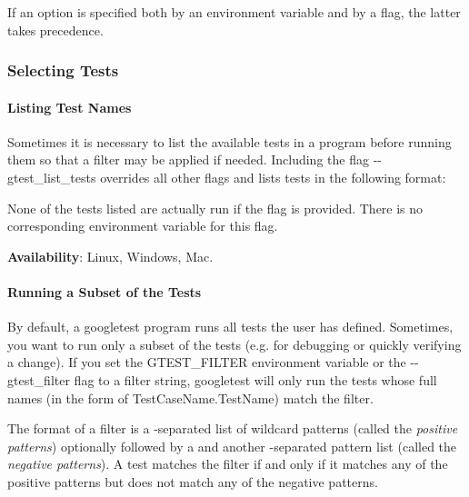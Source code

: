 If an option is specified both by an environment variable and by a flag, the latter takes precedence.

\subsubsection*{Selecting Tests}

\paragraph*{Listing Test Names}

Sometimes it is necessary to list the available tests in a program before running them so that a filter may be applied if needed. Including the flag {\ttfamily -\/-\/gtest\+\_\+list\+\_\+tests} overrides all other flags and lists tests in the following format\+:


\begin{DoxyCode}{0}
\end{DoxyCode}


None of the tests listed are actually run if the flag is provided. There is no corresponding environment variable for this flag.

{\bfseries{Availability}}\+: Linux, Windows, Mac.

\paragraph*{Running a Subset of the Tests}

By default, a googletest program runs all tests the user has defined. Sometimes, you want to run only a subset of the tests (e.\+g. for debugging or quickly verifying a change). If you set the {\ttfamily G\+T\+E\+S\+T\+\_\+\+F\+I\+L\+T\+ER} environment variable or the {\ttfamily -\/-\/gtest\+\_\+filter} flag to a filter string, googletest will only run the tests whose full names (in the form of {\ttfamily Test\+Case\+Name.\+Test\+Name}) match the filter.

The format of a filter is a \textquotesingle{}{\ttfamily \+:}\textquotesingle{}-\/separated list of wildcard patterns (called the {\itshape positive patterns}) optionally followed by a \textquotesingle{}{\ttfamily -\/}\textquotesingle{} and another \textquotesingle{}{\ttfamily \+:}\textquotesingle{}-\/separated pattern list (called the {\itshape negative patterns}). A test matches the filter if and only if it matches any of the positive patterns but does not match any of the negative patterns.

